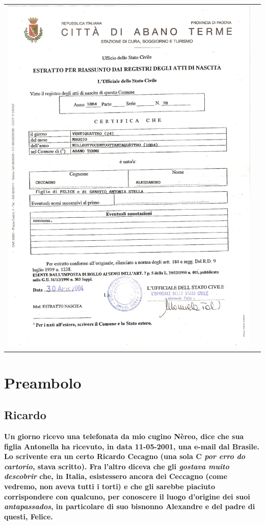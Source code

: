 \documentclass[a4paper,10pt]{book}
\begin{document}
\begin{tabular}{ c c }
  \includegraphics[height=0.35\textheight]{../img/09-alessandro.png}\label{fig:09-alessandro}
  &
\end{tabular}

\chapter*{Preambolo}

\section*{Ricardo}

\textbf{Un giorno ricevo una telefonata da mio cugino Nèreo, dice che sua figlia Antonella ha ricevuto, in data 11-05-2001, una e-mail dal Brasile. Lo scrivente era un certo Ricardo Cecagno (una sola C \emph{por erro do cartorio}, stava scritto). Fra l’altro diceva che gli \emph{gostava muito descobrir} che, in Italia, esistessero ancora dei Ceccagno (come vedremo, non aveva tutti i torti) e che gli sarebbe piaciuto corrispondere con qualcuno, per conoscere il luogo d’origine dei suoi \emph{antapassados}, in particolare di suo bisnonno Alexandre e del padre di questi, Felice.}
\end{document}
